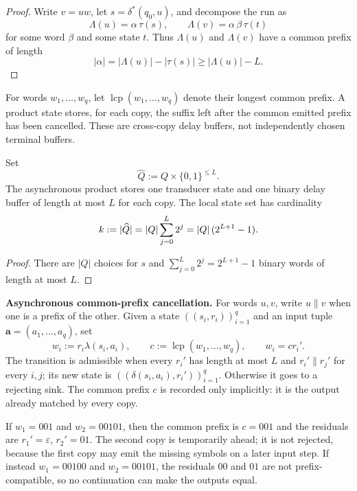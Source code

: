 \begin{proof}
Write \(v=uw\), let \(s=\delta^*(q_0,u)\), and decompose the run as
\[
  \Lambda(u)=\alpha\,\tau(s),
  \qquad
  \Lambda(v)=\alpha\,\beta\,\tau(t)
\]
for some word \(\beta\) and some state \(t\).  Thus \(\Lambda(u)\) and
\(\Lambda(v)\) have a common prefix of length
\[
  |\alpha|=|\Lambda(u)|-|\tau(s)|\ge |\Lambda(u)|-L.
\]
\end{proof}

\begin{definition}
\label{def:appendix-cross-copy-buffers}
For words \(w_1,\dots,w_q\), let
\(\operatorname{lcp}(w_1,\dots,w_q)\) denote their longest common prefix.
A product state stores, for each copy, the suffix left after the common
emitted prefix has been cancelled.  These are cross-copy delay buffers, not
independently chosen terminal buffers.
\end{definition}

\begin{proposition}
\label{prop:appendix-one-copy}
Set
\[
  \widehat Q:=Q\times\{0,1\}^{\le L}.
\]
The asynchronous product stores one transducer state and one binary delay
buffer of length at most \(L\) for each copy.  The local state set has cardinality
\[
  k:=\lvert \widehat Q \rvert
  =
  |Q|\sum_{j=0}^{L}2^j
  =
  |Q|\,(2^{L+1}-1).
\]
\end{proposition}

\begin{proof}
There are \(|Q|\) choices for \(s\) and
\(\sum_{j=0}^{L}2^j=2^{L+1}-1\) binary words of length at most \(L\).
\end{proof}

\medskip
\noindent\textbf{Asynchronous common-prefix cancellation.}
For words \(u,v\), write \(u\parallel v\) when one is a prefix of the other.
Given a state \(((s_i,r_i))_{i=1}^q\) and an input tuple
\(\mathbf a=(a_1,\dots,a_q)\), set
\[
  w_i:=r_i\lambda(s_i,a_i),
  \qquad c:=\operatorname{lcp}(w_1,\dots,w_q),
  \qquad w_i=cr_i'.
\]
The transition is admissible when every \(r_i'\) has length at most \(L\) and
\(r_i'\parallel r_j'\) for every \(i,j\); its new state is
\(((\delta(s_i,a_i),r_i'))_{i=1}^q\).  Otherwise it goes to a rejecting sink.
The common prefix \(c\) is recorded only implicitly: it is the output already
matched by every copy.

\begin{example}[An asynchronous \texorpdfstring{$q=2$}{q=2} update]
\label{ex:appendix-q2-update}
If \(w_1=001\) and \(w_2=00101\), then the common prefix is \(c=001\) and
the residuals are \(r_1'=\varepsilon\), \(r_2'=01\).  The second copy is
temporarily ahead; it is not rejected, because the first copy may emit the
missing symbols on a later input step.  If instead \(w_1=00100\) and
\(w_2=00101\), the residuals \(00\) and \(01\) are not prefix-compatible, so
no continuation can make the outputs equal.
\end{example}

